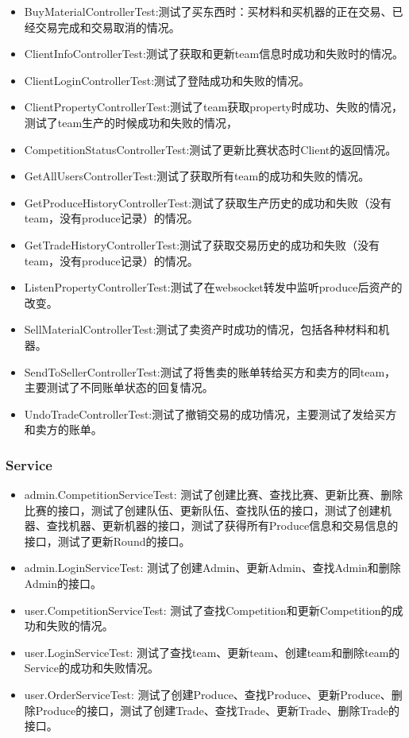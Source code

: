 \documentclass[12pt, a4paper,UTF8]{article}
\begin{document}
							\begin{itemize}
							\item BuyMaterialControllerTest:测试了买东西时：买材料和买机器的正在交易、已经交易完成和交易取消的情况。
							\item ClientInfoControllerTest:测试了获取和更新team信息时成功和失败时的情况。
							\item ClientLoginControllerTest:测试了登陆成功和失败的情况。
							\item ClientPropertyControllerTest:测试了team获取property时成功、失败的情况，测试了team生产的时候成功和失败的情况，
							\item CompetitionStatusControllerTest:测试了更新比赛状态时Client的返回情况。
							\item GetAllUsersControllerTest:测试了获取所有team的成功和失败的情况。
							\item GetProduceHistoryControllerTest:测试了获取生产历史的成功和失败（没有team，没有produce记录）的情况。
							\item GetTradeHistoryControllerTest:测试了获取交易历史的成功和失败（没有team，没有produce记录）的情况。
							\item ListenPropertyControllerTest:测试了在websocket转发中监听produce后资产的改变。
							\item SellMaterialControllerTest:测试了卖资产时成功的情况，包括各种材料和机器。
							\item SendToSellerControllerTest:测试了将售卖的账单转给买方和卖方的同team，主要测试了不同账单状态的回复情况。
							\item UndoTradeControllerTest:测试了撤销交易的成功情况，主要测试了发给买方和卖方的账单。
							\end{itemize}
					\subsubsection{Service}
						\begin{itemize}
							\item admin.CompetitionServiceTest: 测试了创建比赛、查找比赛、更新比赛、删除比赛的接口，测试了创建队伍、更新队伍、查找队伍的接口，测试了创建机器、查找机器、更新机器的接口，测试了获得所有Produce信息和交易信息的接口，测试了更新Round的接口。
							\item admin.LoginServiceTest: 测试了创建Admin、更新Admin、查找Admin和删除Admin的接口。
							\item user.CompetitionServiceTest: 测试了查找Competition和更新Competition的成功和失败的情况。
							\item user.LoginServiceTest: 测试了查找team、更新team、创建team和删除team的Service的成功和失败情况。
							\item user.OrderServiceTest: 测试了创建Produce、查找Produce、更新Produce、删除Produce的接口，测试了创建Trade、查找Trade、更新Trade、删除Trade的接口。
						\end{itemize}
\end{document}
